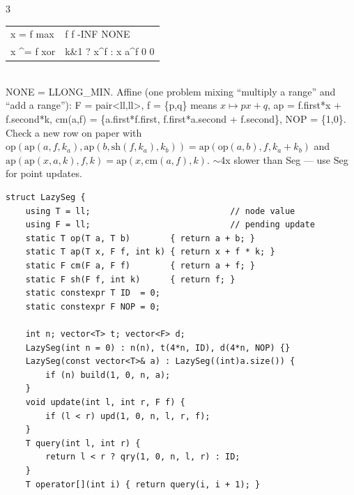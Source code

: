 \documentclass[9pt,a4paper]{extarticle}
\makeatletter
\newcommand{\code}[1]{{\ttfamily\small #1}}
\newenvironment{ctab}[2]{%
  \begingroup\setlength{\tabcolsep}{3pt}%
  \begin{tabular}{@{}p{#1\columnwidth}p{#2\columnwidth}@{}}}%
  {\end{tabular}\endgroup}
\makeatother
\begin{document}
\begin{multicols*}{3}
{{\begin{ctab}{0.30}{0.65}
x = f \hfill max & f \hfill f \hfill -INF \hfill NONE\\
x \textasciicircum= f \hfill xor & k\&1 ? x\textasciicircum f : x \hfill a\textasciicircum f \hfill 0 \hfill 0\\
\end{ctab}}\\[0.3ex]
\code{NONE = LLONG\_MIN}. Affine (one problem mixing ``multiply a range'' and ``add a
range''): \code{F = pair<ll,ll>}, \code{f = \{p,q\}} means $x \mapsto px+q$,
\code{ap = f.first*x + f.second*k}, \code{cm(a,f) = \{a.first*f.first,
f.first*a.second + f.second\}}, \code{NOP = \{1,0\}}.\\[0.3ex]
Check a new row on paper with
$\mathrm{op}(\mathrm{ap}(a,f,k_a), \mathrm{ap}(b,\mathrm{sh}(f,k_a),k_b)) = \mathrm{ap}(\mathrm{op}(a,b), f, k_a{+}k_b)$
and $\mathrm{ap}(\mathrm{ap}(x,a,k),f,k) = \mathrm{ap}(x,\mathrm{cm}(a,f),k)$.
$\sim$4x slower than \code{Seg} --- use \code{Seg} for point updates.}

\begin{lstlisting}
struct LazySeg {
    using T = ll;                            // node value
    using F = ll;                            // pending update
    static T op(T a, T b)        { return a + b; }
    static T ap(T x, F f, int k) { return x + f * k; }
    static F cm(F a, F f)        { return a + f; }
    static F sh(F f, int k)      { return f; }
    static constexpr T ID  = 0;
    static constexpr F NOP = 0;

    int n; vector<T> t; vector<F> d;
    LazySeg(int n = 0) : n(n), t(4*n, ID), d(4*n, NOP) {}
    LazySeg(const vector<T>& a) : LazySeg((int)a.size()) {
        if (n) build(1, 0, n, a);
    }
    void update(int l, int r, F f) {
        if (l < r) upd(1, 0, n, l, r, f);
    }
    T query(int l, int r) {
        return l < r ? qry(1, 0, n, l, r) : ID;
    }
    T operator[](int i) { return query(i, i + 1); }


\end{lstlisting}
\end{multicols*}
\end{document}
